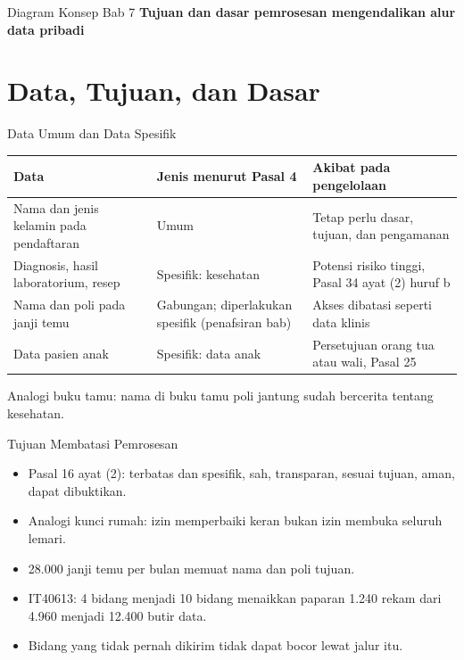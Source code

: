 \documentclass[aspectratio=169, table, 12pt]{beamer}
\begin{document}
\begin{frame}{{\Large Diagram Konsep Bab 7}}
  \centering
  {\small\bfseries Tujuan dan dasar pemrosesan mengendalikan alur data pribadi}\par\medskip
  \label{fig:session07-ilustrasi-bab}
\end{frame}

\section{Data, Tujuan, dan Dasar}

\begin{frame}{{\Large Data Umum dan Data Spesifik}}
  \vspace{4pt}
  \footnotesize
  \begin{tabularx}{\textwidth}{|>{\raggedright\arraybackslash}X|>{\raggedright\arraybackslash}p{}|>{\raggedright\arraybackslash}X|}
    \hline
    \textbf{Data} & \textbf{Jenis menurut Pasal 4} & \textbf{Akibat pada pengelolaan} \\ \hline
    Nama dan jenis kelamin pada pendaftaran & Umum & Tetap perlu dasar, tujuan, dan pengamanan \\
    \hline
    Diagnosis, hasil laboratorium, resep & Spesifik: kesehatan & Potensi risiko tinggi, Pasal 34
    ayat (2) huruf b \\ \hline
    Nama dan poli pada janji temu & Gabungan; diperlakukan spesifik (penafsiran bab) & Akses
    dibatasi
    seperti data klinis \\ \hline
    Data pasien anak & Spesifik: data anak & Persetujuan orang tua atau wali, Pasal 25 \\ \hline
  \end{tabularx}

  \vspace{8pt}
  \small Analogi buku tamu: nama di buku tamu poli jantung sudah bercerita tentang kesehatan.
\end{frame}

\begin{frame}{{\Large Tujuan Membatasi Pemrosesan}}
  \vspace{6pt}
  \small
  \begin{itemize}
    \item Pasal 16 ayat (2): terbatas dan spesifik, sah, transparan, sesuai tujuan, aman, dapat
          dibuktikan.
    \item Analogi kunci rumah: izin memperbaiki keran bukan izin membuka seluruh lemari.
    \item 28.000 janji temu per bulan memuat nama dan poli tujuan.
    \item IT40613: 4 bidang menjadi 10 bidang menaikkan paparan 1.240 rekam dari 4.960 menjadi
          12.400 butir data.
    \item Bidang yang tidak pernah dikirim tidak dapat bocor lewat jalur itu.
  \end{itemize}
\end{frame}
\end{document}
